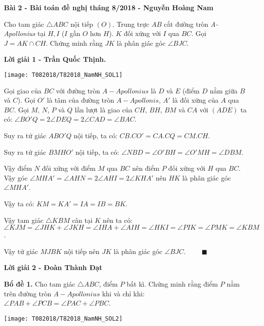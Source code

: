 \begin{framed}\noindent
	
	\textbf{Bài 2 - Bài toán đề nghị tháng 8/2018 - Nguyễn Hoàng Nam}
	
	Cho tam giác $\triangle ABC$ nội tiếp $(O)$. Trung trực $AB$ cắt đường tròn \textit{A-Apollonius} tại $H, I$ ($I$ gần $O$ hơn $H$). $K$ đối xứng với $I$ qua $BC$. Gọi $J = AK \cap CH$. Chứng minh rằng $JK$ là phân giác góc $\angle BJC$.
	
\end{framed}

\textbf{Lời giải 1 - Trần Quốc Thịnh.}

\begin{center}
	\texttt{[image: T082018/T82018\_NamNH\_SOL1]}
	
\end{center}

Gọi giao của $BC$ với đường tròn $A-Apollonius$ là $D$ và $E$ (điểm $D$ nằm giữa $B$ và $C$). Gọi $O'$ là tâm của đường tròn $A-Apollonis$, $A'$ là đối xứng của $A$ qua $BC$. Gọi $M$, $N$, $P$ và $Q$ lần lượt là giao của $CH$, $BH$, $BM$ và $CA$ với $(ADE)$ ta có: $\angle BO'Q = 2 \angle DEQ = 2 \angle CAD = \angle BAC$.

Suy ra tứ giác $ABO'Q$ nội tiếp, ta có:
$ CB . CO' = CA . CQ = CM . CH$.

Suy ra tứ giác $BMHO'$ nội tiếp, ta có: $ \angle NBD = \angle O'BH = \angle O'MH = \angle DBM$.

Vậy điểm $N$ đối xứng với điểm $M$ qua $BC$ nên điểm $P$ đối xứng với $H$ qua $BC$. Vậy góc $\angle MHA' = \angle AHN = 2\angle AHI = 2\angle KHA'$ nên $HK$ là phân giác góc $\angle MHA'$.

Vậy ta có: $KM = KA' = IA = IB = BK$.

Vậy tam giác $\triangle KBM$ cân tại $K$ nên ta có: $ \angle KJM = \angle JHK + \angle JKH = \angle IHA + \angle AIH = \angle HKI = \angle PIK = \angle PMK = \angle KBM$.

Vậy tứ giác $MJBK$ nội tiếp nên $JK$ là phân giác góc $\angle BJC$. $\qquad \blacksquare$

\textbf{Lời giải 2 - Đoàn Thành Đạt}

\textbf{Bổ đề 1.} Cho tam giác $\triangle ABC$, điểm $P$ bất kì. Chứng minh rằng điểm $P$ nằm trên đường tròn $A-Apollonius$ khi và chỉ khi: $\angle PAB + \angle PCB = \angle PAC + \angle PBC$.
\begin{center}
	\texttt{[image: T082018/T82018\_NamNH\_SOL2]}
	
\end{center}

